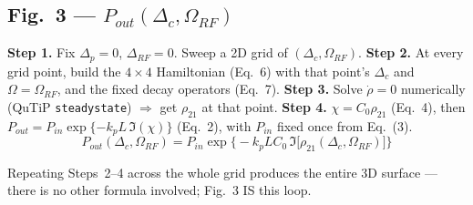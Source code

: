 \documentclass[11pt]{article}
\begin{document}
\subsection*{Fig.~3 --- $P_{out}(\Delta_c,\Omega_{RF})$}
\textbf{Step 1.} Fix $\Delta_p=0$, $\Delta_{RF}=0$. Sweep a 2D grid of $(\Delta_c,\Omega_{RF})$.
\textbf{Step 2.} At every grid point, build the $4\times4$ Hamiltonian (Eq.~6) with that point's $\Delta_c$ and $\Omega=\Omega_{RF}$, and the fixed decay operators (Eq.~7).
\textbf{Step 3.} Solve $\dot\rho=0$ numerically (QuTiP \texttt{steadystate}) $\Rightarrow$ get $\rho_{21}$ at that point.
\textbf{Step 4.} $\chi = C_0\rho_{21}$ (Eq.~4), then $P_{out}=P_{in}\exp\{-k_pL\,\Im(\chi)\}$ (Eq.~2), with $P_{in}$ fixed once from Eq.~(3).
\[
\boxed{P_{out}(\Delta_c,\Omega_{RF}) = P_{in}\exp\Big\{-k_pLC_0\,\Im\big[\rho_{21}(\Delta_c,\Omega_{RF})\big]\Big\}}
\]
\begin{center}
\end{center}
Repeating Steps~2--4 across the whole grid produces the entire 3D surface --- there is no other formula involved; Fig.~3 IS this loop.
\end{document}
